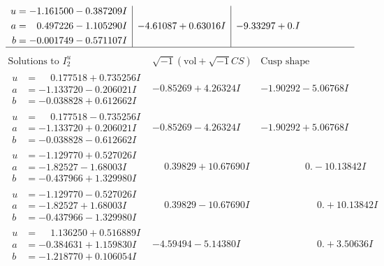 \documentclass[1p]{elsarticle_modified}
\theoremstyle{definition}
\newcommand{\I}{\sqrt{-1}}
\begin{document}
$$\begin{array}{c|c|c}
\begin{aligned}
u &= -1.161500 - 0.387209 I \\
a &= \phantom{-}0.497226 - 1.105290 I \\
b &= -0.001749 - 0.571107 I\end{aligned}
 & -4.61087 + 0.63016 I & -9.33297 + 0. I\phantom{ +0.000000I}\\
 \hline 
 \end{array}$$\newpage$$\begin{array}{c|c|c}  
\text{Solutions to }I^u_{2}& \I (\text{vol} + \sqrt{-1}CS) & \text{Cusp shape}\\
 \hline 
\begin{aligned}
u &= \phantom{-}0.177518 + 0.735256 I \\
a &= -1.133720 - 0.206021 I \\
b &= -0.038828 + 0.612662 I\end{aligned}
 & -0.85269 + 4.26324 I & -1.90292 - 5.06768 I \\ \hline\begin{aligned}
u &= \phantom{-}0.177518 - 0.735256 I \\
a &= -1.133720 + 0.206021 I \\
b &= -0.038828 - 0.612662 I\end{aligned}
 & -0.85269 - 4.26324 I & -1.90292 + 5.06768 I \\ \hline\begin{aligned}
u &= -1.129770 + 0.527026 I \\
a &= -1.82527 - 1.68003 I \\
b &= -0.437966 + 1.329980 I\end{aligned}
 & \phantom{-}0.39829 + 10.67690 I & \phantom{-0.000000 } 0. - 10.13842 I \\ \hline\begin{aligned}
u &= -1.129770 - 0.527026 I \\
a &= -1.82527 + 1.68003 I \\
b &= -0.437966 - 1.329980 I\end{aligned}
 & \phantom{-}0.39829 - 10.67690 I & \phantom{-0.000000 -}0. + 10.13842 I \\ \hline\begin{aligned}
u &= \phantom{-}1.136250 + 0.516889 I \\
a &= -0.384631 + 1.159830 I \\
b &= -1.218770 + 0.106054 I\end{aligned}
 & -4.59494 - 5.14380 I & \phantom{-0.000000 -}0. + 3.50636 I \\ \hline\begin{aligned}

\end{aligned}
\end{array}$$
\end{document}
